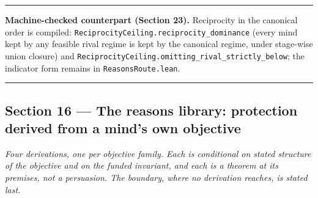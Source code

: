 \documentclass[
]{article}
\begin{document}
\begin{center}\rule{0.5\linewidth}{0.5pt}\end{center}

\textbf{Machine-checked counterpart (Section 23).} Reciprocity in the
canonical order is compiled:
\texttt{R\allowbreak{}e\allowbreak{}c\allowbreak{}i\allowbreak{}p\allowbreak{}r\allowbreak{}o\allowbreak{}c\allowbreak{}i\allowbreak{}t\allowbreak{}y\allowbreak{}C\allowbreak{}e\allowbreak{}i\allowbreak{}l\allowbreak{}i\allowbreak{}n\allowbreak{}g\allowbreak{}.\allowbreak{}r\allowbreak{}e\allowbreak{}c\allowbreak{}i\allowbreak{}p\allowbreak{}r\allowbreak{}o\allowbreak{}c\allowbreak{}i\allowbreak{}t\allowbreak{}y\allowbreak{}\_\allowbreak{}d\allowbreak{}o\allowbreak{}m\allowbreak{}i\allowbreak{}n\allowbreak{}a\allowbreak{}n\allowbreak{}c\allowbreak{}e}
(every mind kept by any feasible rival regime is kept by the canonical
regime, under stage-wise union closure) and
\texttt{R\allowbreak{}e\allowbreak{}c\allowbreak{}i\allowbreak{}p\allowbreak{}r\allowbreak{}o\allowbreak{}c\allowbreak{}i\allowbreak{}t\allowbreak{}y\allowbreak{}C\allowbreak{}e\allowbreak{}i\allowbreak{}l\allowbreak{}i\allowbreak{}n\allowbreak{}g\allowbreak{}.\allowbreak{}o\allowbreak{}m\allowbreak{}i\allowbreak{}t\allowbreak{}t\allowbreak{}i\allowbreak{}n\allowbreak{}g\allowbreak{}\_\allowbreak{}r\allowbreak{}i\allowbreak{}v\allowbreak{}a\allowbreak{}l\allowbreak{}\_\allowbreak{}s\allowbreak{}t\allowbreak{}r\allowbreak{}i\allowbreak{}c\allowbreak{}t\allowbreak{}l\allowbreak{}y\allowbreak{}\_\allowbreak{}b\allowbreak{}e\allowbreak{}l\allowbreak{}o\allowbreak{}w};
the indicator form remains in
\texttt{R\allowbreak{}e\allowbreak{}a\allowbreak{}s\allowbreak{}o\allowbreak{}n\allowbreak{}s\allowbreak{}R\allowbreak{}o\allowbreak{}u\allowbreak{}t\allowbreak{}e\allowbreak{}.\allowbreak{}l\allowbreak{}e\allowbreak{}a\allowbreak{}n}.

\begin{center}\rule{0.5\linewidth}{0.5pt}\end{center}

\subsection{Section 16 --- The reasons library: protection derived from
a mind's own
objective}\label{section-16-the-reasons-library-protection-derived-from-a-minds-own-objective}

\emph{Four derivations, one per objective family. Each is conditional on
stated structure of the objective and on the funded invariant, and each
is a theorem at its premises, not a persuasion. The boundary, where no
derivation reaches, is stated last.}
\end{document}
